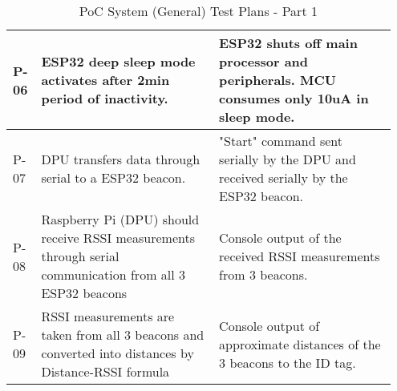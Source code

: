 \begin{table}[h!]
\begin{tabular}{|m{0.05\linewidth}|m{0.45\linewidth}|m{0.45\linewidth}|}
    P-06
    & ESP32 deep sleep mode activates after 2min period of inactivity. 
    & ESP32 shuts off main processor and peripherals. MCU consumes only 10uA in sleep mode.\\ 
    \hline

    P-07
    & DPU transfers data through serial to a ESP32 beacon.
    & "Start" command sent serially by the DPU and received serially by the ESP32 beacon.\\ 
    \hline

    P-08
    & Raspberry Pi (DPU) should receive RSSI measurements through serial communication from all 3 ESP32 beacons
    & Console output of the received RSSI measurements from 3 beacons. \\ 
    \hline

    P-09
    & RSSI measurements are taken from all 3 beacons and converted into distances by Distance-RSSI formula
    & Console output of approximate distances of the 3 beacons to the ID tag. \\ 
    \hline
    \end{tabular}
    \caption{PoC System (General) Test Plans - Part 1}
\end{table}
\pagebreak
